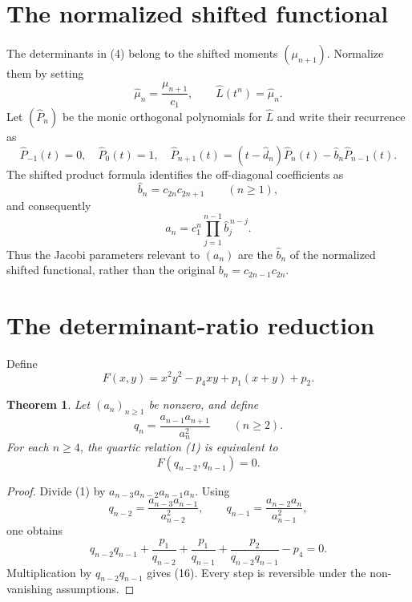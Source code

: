 \documentclass[11pt]{article}
\newtheorem{theorem}{Theorem}
\theoremstyle{remark}
\begin{document}
\section{The normalized shifted functional}
The determinants in (4) belong to the shifted moments $(\mu_{n+1})$. Normalize them by setting
\begin{equation}
\widehat\mu_n=\frac{\mu_{n+1}}{c_1},\qquad \widehat L(t^n)=\widehat\mu_n.
\end{equation}
Let $(\widehat P_n)$ be the monic orthogonal polynomials for $\widehat L$ and write their recurrence as
\begin{equation}
\widehat P_{-1}(t)=0,\quad \widehat P_0(t)=1,\quad
\widehat P_{n+1}(t)=(t-\widehat d_n)\widehat P_n(t)-\widehat b_n\widehat P_{n-1}(t).
\end{equation}
The shifted product formula identifies the off-diagonal coefficients as
\begin{equation}
\widehat b_n=c_{2n}c_{2n+1}\qquad(n\ge1),
\end{equation}
and consequently
\begin{equation}
a_n=c_1^n\prod_{j=1}^{n-1}\widehat b_j^{\,n-j}.
\end{equation}
Thus the Jacobi parameters relevant to $(a_n)$ are the $\widehat b_n$ of the normalized shifted functional, rather than the original $b_n=c_{2n-1}c_{2n}$.

\section{The determinant-ratio reduction}
Define
\begin{equation}
F(x,y)=x^2y^2-p_4xy+p_1(x+y)+p_2.
\end{equation}
\begin{theorem}
Let $(a_n)_{n\ge1}$ be nonzero, and define
\begin{equation}
q_n=\frac{a_{n-1}a_{n+1}}{a_n^2}\qquad(n\ge2).
\end{equation}
For each $n\ge4$, the quartic relation (1) is equivalent to
\begin{equation}
F(q_{n-2},q_{n-1})=0.
\end{equation}
\end{theorem}
\begin{proof}
Divide (1) by $a_{n-3}a_{n-2}a_{n-1}a_n$. Using
\[
q_{n-2}=\frac{a_{n-3}a_{n-1}}{a_{n-2}^2},\qquad
q_{n-1}=\frac{a_{n-2}a_n}{a_{n-1}^2},
\]
one obtains
\[
q_{n-2}q_{n-1}+\frac{p_1}{q_{n-2}}+\frac{p_1}{q_{n-1}}
+\frac{p_2}{q_{n-2}q_{n-1}}-p_4=0.
\]
Multiplication by $q_{n-2}q_{n-1}$ gives (16). Every step is reversible under the non-vanishing assumptions.
\end{proof}
\end{document}
